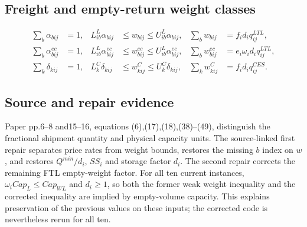 \documentclass{article}
\begin{document}
\subsection*{Freight and empty-return weight classes}
\begin{align}
\sum_b\alpha_{bij}&=1,&
L^L_{ib}\alpha_{bij}&\le w_{bij}\le U^L_{ib}\alpha_{bij},&
\sum_bw_{bij}&=f_id_iq_{ij}^{LTL},\\
\sum_b\alpha^{ec}_{bij}&=1,&
L^L_{ib}\alpha^{ec}_{bij}&\le w^{ec}_{bij}\le U^L_{ib}\alpha^{ec}_{bij},&
\sum_bw^{ec}_{bij}&=e_i\omega_i d_iq_{ij}^{LTL},\\
\sum_k\delta_{kij}&=1,&
L^C_k\delta_{kij}&\le w^C_{kij}\le U^C_k\delta_{kij},&
\sum_kw^C_{kij}&=f_i d_iq_{ij}^{CES}.
\end{align}

\subsection*{Source and repair evidence}
Paper pp.6--8 and15--16, equations (6),(17),(18),(38)--(49), distinguish the
fractional shipment quantity and physical capacity units. The source-linked
first repair separates price rates from weight bounds, restores the missing
$b$ index on $w$, and restores $Q^{min}/d_i$, $SS_i$ and storage factor $d_i$.
The second repair corrects the remaining FTL empty-weight factor.
For all ten current instances, $\omega_i Cap_L\le Cap_{WL}$ and $d_i\ge1$,
so both the former weak weight inequality and the corrected inequality are
implied by empty-volume capacity. This explains preservation of the previous
values on these inputs; the corrected code is nevertheless rerun for all ten.
\end{document}
